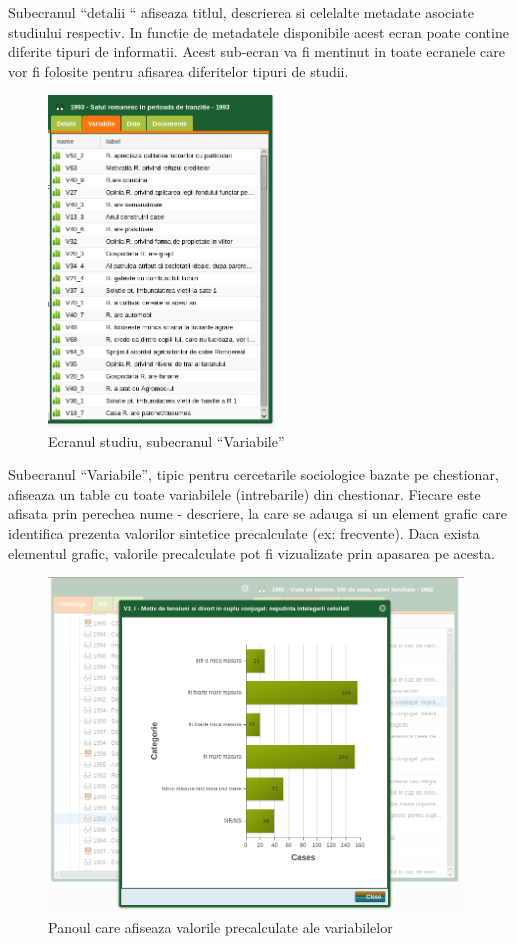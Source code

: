 Subecranul ``detalii `` afiseaza titlul, descrierea si celelalte
metadate asociate studiului respectiv. In functie de metadatele disponibile
acest ecran poate contine diferite tipuri de informatii. Acest sub-ecran
va fi mentinut in toate ecranele care vor fi folosite pentru afisarea
diferitelor tipuri de studii.

\begin{figure}[H]
\begin{centering}
\includegraphics[width=6cm]{screenshots/details-panel-study-variabile}
\par\end{centering}
\caption{Ecranul studiu, subecranul ``Variabile''}
\end{figure}

Subecranul ``Variabile'', tipic pentru cercetarile sociologice bazate
pe chestionar, afiseaza un table cu toate variabilele (intrebarile)
din chestionar. Fiecare este afisata prin perechea nume - descriere,
la care se adauga si un element grafic care identifica prezenta valorilor
sintetice precalculate (ex: frecvente). Daca exista elementul grafic,
valorile precalculate pot fi vizualizate prin apasarea pe acesta.

\begin{figure}[H]
\begin{centering}
\includegraphics[width=11cm]{screenshots/details-panel-study-chart}
\par\end{centering}
\caption{Panoul care afiseaza valorile precalculate ale variabilelor}
\end{figure}

